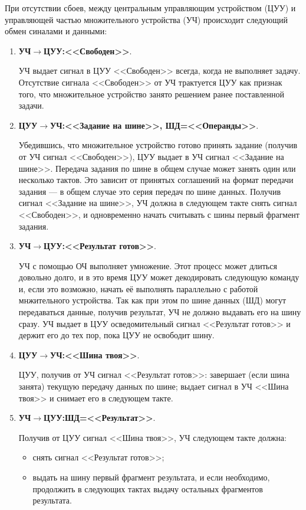 При отсутствии сбоев, между центральным управляющим устройством (ЦУУ) и управляющей частью множительного устройства (УЧ) происходит следующий обмен синалами и данными:
\begin{enumerate}
    \item \textbf{УЧ$\to$ЦУУ:<<Свободен>>}. 
    
    УЧ выдает сигнал в ЦУУ <<Свободен>> всегда, когда не выполняет задачу. Отсутствие сигнала <<Свободен>> от УЧ трактуется ЦУУ как признак того, что множительное устройство занято решением ранее поставленной задачи.
    
    \item \textbf{ЦУУ$\to$УЧ:<<Задание на шине>>, ШД=<<Операнды>>}.

    Убедившись, что множительное устройство готово принять задание (получив от УЧ сигнал <<Свободен>>), ЦУУ выдает в УЧ сигнал <<Задание на шине>>. Передача задания по шине в общем случае может занять один или несколько тактов. Это зависит от принятых соглашений на формат передачи задания --- в общем случае это серия передач по шине данных. Получив сигнал <<Задание на шине>>, УЧ должна в следующем такте снять сигнал <<Свободен>>, и одновременно начать считывать с шины первый фрагмент задания.
    
    \item \textbf{УЧ$\to$ЦУУ:<<Результат готов>>}. 
    
    УЧ с помощью ОЧ выполняет умножение. Этот процесс может длиться довольно долго, и в это время ЦУУ может декодировать следующую команду и, если это возможно, начать её выполнять параллельно с работой мнжительного устройства. Так как при этом по шине данных (ШД) могут передаваться данные, получив результат, УЧ не должно выдавать его на шину сразу. УЧ выдает в ЦУУ осведомительный сигнал <<Результат готов>> и держит его до тех пор, пока ЦУУ не освободит шину.
    
    \item \textbf{ЦУУ$\to$УЧ:<<Шина твоя>>}. 
    
    ЦУУ, получив от УЧ сигнал <<Результат готов>>: завершает (если шина занята) текущую передачу данных по шине; выдает сигнал в УЧ <<Шина твоя>> и снимает его в следующем такте.
    
    \item \textbf{УЧ$\to$ЦУУ:ШД=<<Результат>>}. 
    
    Получив от ЦУУ сигнал <<Шина твоя>>, УЧ следующем такте должна:
    \begin{itemize}
        \item снять сигнал <<Результат готов>>;
        \item выдать на шину первый фрагмент результата, и если необходимо, продолжить в следующих тактах выдачу остальных фрагментов результата.
    \end{itemize}
\end{enumerate}


